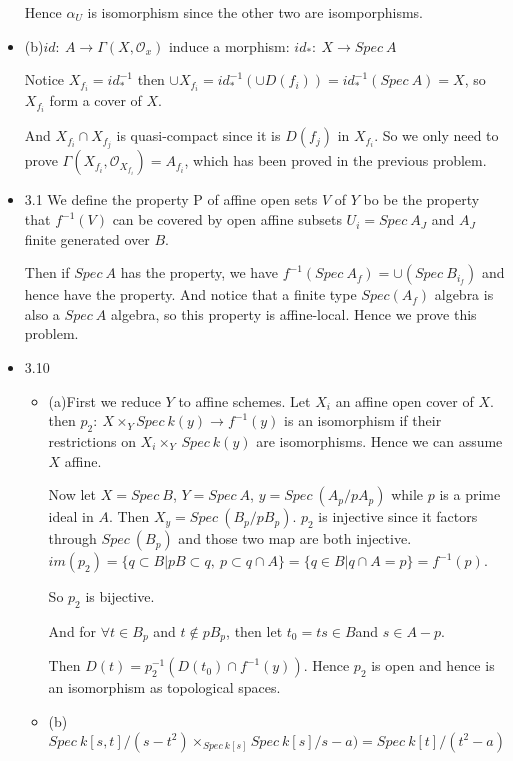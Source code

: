 \documentclass[11pt]{article}
\newcommand{\oda}{\mathcal{O}}
\begin{document}
\begin{itemize}
\begin{itemize}
\end{itemize}

Hence $\alpha_U$ is isomorphism since the other two are isomporphisms.

\item(b)$id: \ A\to \Gamma(X,\oda_x)$ induce a morphism: $id_*: \ X \to Spec \  A$

Notice $X_{f_i}=id_*^{-1}$ then $\cup X_{f_i}=id_*^{-1}(\cup D(f_i))=id_*^{-1}(Spec \  A)=X$, so $X_{f_i}$ form a cover of $X$.

And $X_{f_i} \cap X_{f_j}$ is quasi-compact since it is $D(f_j)$ in $X_{f_i}$. So we only need to prove $\Gamma(X_{f_i}, \oda_{X_{f_i}})=A_{f_i}$, which has been proved in the previous problem.
\item 3.1 We define the property P of affine open sets $V$ of $Y$ bo be the property that $f^{-1}(V)$ can be covered by open affine subsets $U_i=Spec \  A_J$ and $A_J$ finite generated over $B$.

Then if $Spec \ A$ has the property, we have $f^{-1}(Spec  \ A_f)=\cup(Spec \ B_{i_f})$ and hence have the property. And notice that a finite type $Spec (A_f)$ algebra is also a $Spec \ A$ algebra, so this property is affine-local. Hence we prove this problem.
\item 3.10 \begin{itemize}
\item (a)First we reduce $Y$ to affine schemes. Let $X_i$ an affine open cover of $X$. then $p_2: \ X \times _Y Spec  \ k(y) \to f^{-1}(y)$ is an isomorphism if their restrictions on $X_i \times  _Y \ Spec  \ k(y)$ are isomorphisms. Hence we can assume $X$ affine.

Now let $X=Spec \  B$, $Y=Spec \  A$, $y=Spec \ (A_p/pA_p)$ while $p$ is a prime ideal in $A$. Then $X_y=Spec \ (B_p/pB_p)$. $p_2$ is injective since it factors through $Spec \ (B_p)$ and those two map are both injective. $im(p_2)=\{ q\subset B|pB \subset q, \ p\subset q\cap A\}=\{q\in B|q \cap A=p\}=f^{-1}(p)$.

So $p_2$ is bijective.

And for $\forall t \in B_p$ and $t \notin pB_p$, then let $t_0=ts \in B$and $s \in A-p$.

Then $D(t)=p_2^{-1}(D(t_0)\cap f^{-1}(y))$. Hence $p_2$ is open and hence is an isomorphism as topological spaces.

\item (b)$Spec \ k[s,t]/(s-t^2) \times _{Spec \  k[s]} Spec  \ k[s]/s-a)=Spec  \ k[t]/(t^2-a)$


\end{itemize}
\end{itemize}
\end{document}
